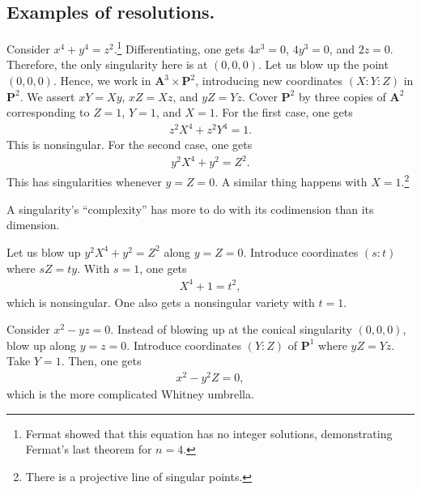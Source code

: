 \documentclass [11 pt, oneside] {article}
\begin{document}
\subsection{Examples of resolutions.}
\begin{example}[ ]\label{}\text{}
Consider $x^4+y^4=z^2$.\footnote{Fermat showed that this equation has no integer solutions, demonstrating Fermat's last theorem for $n=4$.} Differentiating, one gets $4x^3=0$, $4y^3=0$, and $2z=0$. Therefore, the only singularity here is at $(0,0,0)$. Let us blow up the point $(0,0,0)$. Hence, we work in $\mathbf{A}^3\times \mathbf{P}^2$, introducing new coordinates $(X:Y:Z)$ in $\mathbf{P}^2$. We assert $xY=Xy$, $xZ=Xz$, and $yZ=Yz$. Cover $\mathbf{P}^2$ by three copies of $\mathbf{A}^2$ corresponding to $Z=1$, $Y=1$, and $X=1$. For the first case, one gets 
\begin{align*}
	z^2X^4+z^2Y^4=1.
\end{align*}
This is nonsingular. For the second case, one gets
\begin{align*}
	y^2X^4+y^2=Z^2.
\end{align*}
This has singularities whenever $y=Z=0$. A similar thing happens with $X=1$.\footnote{There is a projective line of singular points.}

\begin{remark}
	A singularity's ``complexity'' has more to do with its codimension than its dimension.
\end{remark}

Let us blow up $y^2X^4+y^2=Z^2$ along $y=Z=0$. Introduce coordinates $(s:t)$ where $sZ=ty$. With $s=1$, one gets 
\begin{align*}
	X^4 + 1=t^2,
\end{align*}
which is nonsingular. One also gets a nonsingular variety with $t=1$.
\end{example}


\begin{example}\label{}\text{}
Consider $x^2-yz=0$. Instead of blowing up at the conical singularity $(0,0,0)$, blow up along $y=z=0$. Introduce coordinates $(Y:Z)$ of $\mathbf{P}^1$ where $yZ=Yz$. Take $Y=1$. Then, one gets
\begin{align*}
	x^2-y^2Z=0,
\end{align*}
which is the more complicated Whitney umbrella.
\end{example}
\end{document}
